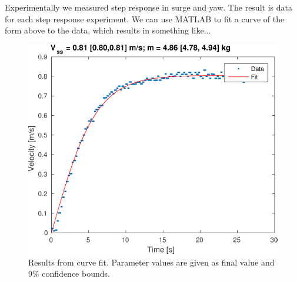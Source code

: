 \documentclass[11pt,draftcls,journal,onecolumn]{../latexlib/latex_ieee/IEEEtran}
\begin{document}
Experimentally we measured step response in surge and yaw.  The result is data for each step response experiment.  We can use MATLAB to fit a curve of the form above to the data, which results in something like...


\begin{figure}[htbp]
\centering
\includegraphics[width=0.9\linewidth]{fit_2.png}
\caption{Results from curve fit.  Parameter values are given as final value and 9\% confidence bounds.}
\label{f:t-cmd}
\end{figure}
\end{document}
